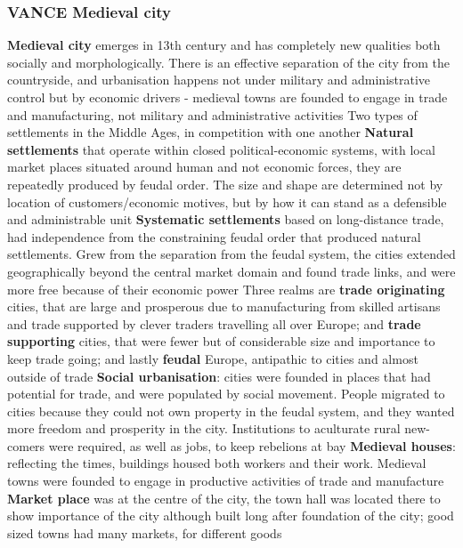 \documentclass{article}
\begin{document}
\subsubsection{VANCE Medieval city}

\begin{outline}
	\1 \textbf{Medieval city} emerges in 13th century and has completely new qualities both socially and morphologically. There is an effective separation of the city from the countryside, and urbanisation happens not under military and administrative control but by economic drivers - medieval towns are founded to engage in trade and manufacturing, not military and administrative activities
	\1 Two types of settlements in the Middle Ages, in competition with one another
		\2 \textbf{Natural settlements} that operate within closed political-economic systems, with local market places situated around human and not economic forces, they are repeatedly produced by feudal order. The size and shape are determined not by location of customers/economic motives, but by how it can stand as a defensible and administrable unit
		\2 \textbf{Systematic settlements} based on long-distance trade, had independence from the constraining feudal order that produced natural settlements. Grew from the separation from the feudal system, the cities extended geographically beyond the central market domain and found trade links, and were more free because of their economic power
	\1 Three realms are \textbf{trade originating} cities, that are large and prosperous due to manufacturing from skilled artisans and trade supported by clever traders travelling all over Europe; and \textbf{trade supporting} cities, that were fewer but of considerable size and importance to keep trade going; and lastly \textbf{feudal} Europe, antipathic to cities and almost outside of trade
	\1 \textbf{Social urbanisation}: cities were founded in places that had potential for trade, and were populated by social movement. People migrated to cities because they could not own property in the feudal system, and they wanted more freedom and prosperity in the city. Institutions to aculturate rural new-comers were required, as well as jobs, to keep rebelions at bay
	\1 \textbf{Medieval houses}: reflecting the times, buildings housed both workers and their work. Medieval towns were founded to engage in productive activities of trade and manufacture
	\1 \textbf{Market place} was at the centre of the city, the town hall was located there to show importance of the city although built long after foundation of the city; good sized towns had many markets, for different goods

\end{outline}
\end{document}
